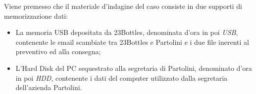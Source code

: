 Viene premesso che il materiale d'indagine del caso consiste in due supporti di memorizzazione dati: 
\begin{itemize}
    \item La memoria USB depositata da 23Bottles, denominata d'ora in poi \textit{USB}, contenente le email scambiate tra 23Bottles e Partolini e i due file inerenti al preventivo ed alla consegna;
    \item L'Hard Disk del PC sequestrato alla segretaria di Partolini, denominato d'ora in poi \textit{HDD}, contenente i dati del computer utilizzato dalla segretaria dell'azienda Partolini.
\end{itemize}